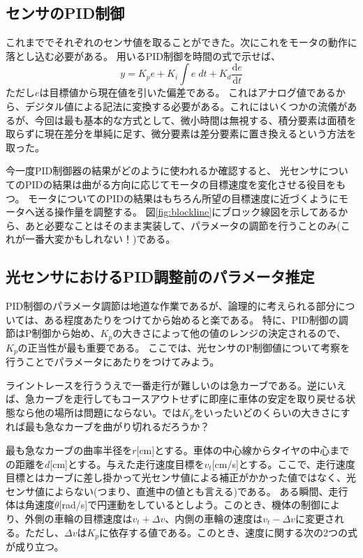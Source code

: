 \documentclass{ltjsreport}
\begin{document}
\subsection{センサのPID制御}\label{sec:SensorIntegration}
これまででそれぞれのセンサ値を取ることができた。次にこれをモータの動作に落とし込む必要がある。
用いるPID制御を時間の式で示せば、
\[
  y = K_p e + K_i \int e \; dt + K_d  \frac{\mathrm{d}e}{\mathrm{d}t}
\]
ただし$e$は目標値から現在値を引いた偏差である。
これはアナログ値であるから、デジタル値による記法に変換する必要がある。これにはいくつかの流儀があるが、今回は最も基本的な方式として、微小時間は無視する、積分要素は面積を取らずに現在差分を単純に足す、微分要素は差分要素に置き換えるという方法を取った。

今一度PID制御器の結果がどのように使われるか確認すると、
光センサについてのPIDの結果は曲がる方向に応じてモータの目標速度を変化させる役目をもつ。
モータについてのPIDの結果はもちろん所望の目標速度に近づくようにモータへ送る操作量を調整する。
図\ref{fig:blockline}にブロック線図を示してあるから、あと必要なことはそのまま実装して、パラメータの調節を行うことのみ(これが一番大変かもしれない！)である。

\subsection{光センサにおけるPID調整前のパラメータ推定}\label{sec:PIDestimate}
PID制御のパラメータ調節は地道な作業であるが、論理的に考えられる部分については、ある程度あたりをつけてから始めると楽である。
特に、PID制御の調節はP制御から始め、$K_p$の大きさによって他の値のレンジの決定されるので、$K_p$の正当性が最も重要である。
ここでは、光センサのP制御値について考察を行うことでパラメータにあたりをつけてみよう。

ライントレースを行ううえで一番走行が難しいのは急カーブである。逆にいえば、急カーブを走行してもコースアウトせずに即座に車体の安定を取り戻せる状態なら他の場所は問題にならない。では$K_p$をいったいどのくらいの大きさにすれば最も急なカーブを曲がり切れるだろうか？

最も急なカーブの曲率半径を$r$[cm]とする。車体の中心線からタイヤの中心までの距離を$d$[cm]とする。与えた走行速度目標を$v_t$[cm/s]とする。ここで、走行速度目標とはカーブに差し掛かって光センサ値による補正がかかった値ではなく、光センサ値によらない(つまり、直進中の値とも言える)である。
ある瞬間、走行体は角速度$\dot{\theta}$[rad/s]で円運動をしているとしよう。このとき、機体の制御により、外側の車輪の目標速度は$v_t + \Delta v$、内側の車輪の速度は$v_t - \Delta v$に変更される。ただし、$\Delta v $は$K_p$に依存する値である。このとき、速度に関する次の2つの式が成り立つ。
\end{document}
